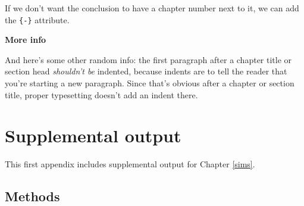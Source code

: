 \documentclass[12pt, twoside]{amherstthesis}
\begin{document}
If we don't want the conclusion to have a chapter number next to it, we can add the \texttt{\{-\}} attribute.

\textbf{More info}

And here's some other random info: the first paragraph after a chapter title or section head \emph{shouldn't be} indented, because indents are to tell the reader that you're starting a new paragraph. Since that's obvious after a chapter or section title, proper typesetting doesn't add an indent there.

\appendix

\hypertarget{appa}{%
\chapter{Supplemental output}\label{appa}}

This first appendix includes supplemental output for Chapter \ref{sims}.

\hypertarget{suppmethods}{%
\section{Methods}\label{suppmethods}}
\end{document}

